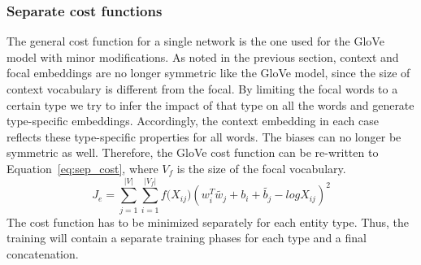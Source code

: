 \subsubsection{Separate cost functions}
\label{sec:normal_cost}

The general cost function for a single network is the one used for the GloVe model with minor modifications.
As noted in the previous section, context and focal embeddings are no longer symmetric like the GloVe model, since the size of context vocabulary is different from the focal. 
By limiting the focal words to a certain type we try to infer the impact of that type on all the words and generate type-specific embeddings. Accordingly, the context embedding in each case reflects these type-specific properties for all words. The biases can no longer be symmetric as well. Therefore, the GloVe cost function can be re-written to Equation~\ref{eq:sep_cost}, where $V_f$ is the size of the focal vocabulary.
\begin{equation}
J_e=\sum _{ j=1 }^{ |V| }{}\sum _{ i=1 }^{ |V_f| }{ f({ X }_{ ij } } )(w_{ i }^{ T }\tilde{  w_{ j } } +b_{ i }+\tilde{  b_{ j } } -log{ X }_{ ij })^2
\label{eq:sep_cost}
\end{equation}
The cost function has to be minimized separately for each entity type. Thus, the training will contain a separate training phases for each type and a final concatenation. 

